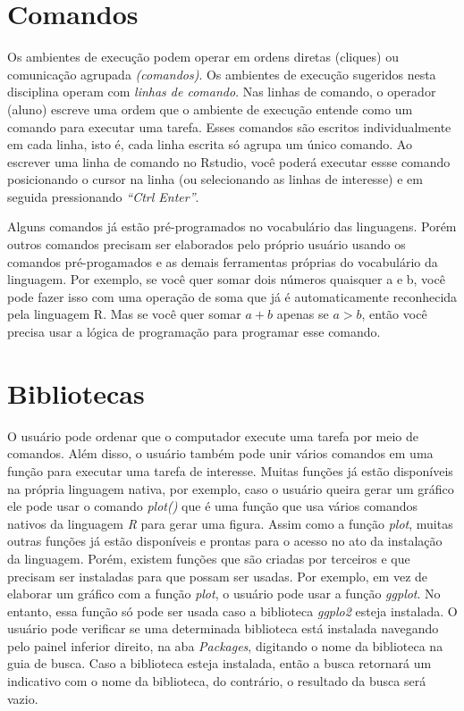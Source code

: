 \documentclass[
  letterpaper,
  DIV=11,
  numbers=noendperiod]{scrreprt}
\begin{document}
\section{Comandos}\label{comandos}

Os ambientes de execução podem operar em ordens diretas (cliques) ou
comunicação agrupada \emph{(comandos)}. Os ambientes de execução
sugeridos nesta disciplina operam com \emph{linhas de comando}. Nas
linhas de comando, o operador (aluno) escreve uma ordem que o ambiente
de execução entende como um comando para executar uma tarefa. Esses
comandos são escritos individualmente em cada linha, isto é, cada linha
escrita só agrupa um único comando. Ao escrever uma linha de comando no
Rstudio, você poderá executar essse comando posicionando o cursor na
linha (ou selecionando as linhas de interesse) e em seguida pressionando
\emph{``Ctrl Enter''}.

Alguns comandos já estão pré-programados no vocabulário das linguagens.
Porém outros comandos precisam ser elaborados pelo próprio usuário
usando os comandos pré-progamados e as demais ferramentas próprias do
vocabulário da linguagem. Por exemplo, se você quer somar dois números
quaisquer a e b, você pode fazer isso com uma operação de soma que já é
automaticamente reconhecida pela linguagem R. Mas se você quer somar
\(a + b\) apenas se \(a > b\), então você precisa usar a lógica de
programação para programar esse comando.

\section{Bibliotecas}\label{bibliotecas}

O usuário pode ordenar que o computador execute uma tarefa por meio de
comandos. Além disso, o usuário também pode unir vários comandos em uma
função para executar uma tarefa de interesse. Muitas funções já estão
disponíveis na própria linguagem nativa, por exemplo, caso o usuário
queira gerar um gráfico ele pode usar o comando \emph{plot()} que é uma
função que usa vários comandos nativos da linguagem \emph{R} para gerar
uma figura. Assim como a função \emph{plot}, muitas outras funções já
estão disponíveis e prontas para o acesso no ato da instalação da
linguagem. Porém, existem funções que são criadas por terceiros e que
precisam ser instaladas para que possam ser usadas. Por exemplo, em vez
de elaborar um gráfico com a função \emph{plot}, o usuário pode usar a
função \emph{ggplot}. No entanto, essa função só pode ser usada caso a
biblioteca \emph{ggplo2} esteja instalada. O usuário pode verificar se
uma determinada biblioteca está instalada navegando pelo painel inferior
direito, na aba \emph{Packages}, digitando o nome da biblioteca na guia
de busca. Caso a biblioteca esteja instalada, então a busca retornará um
indicativo com o nome da biblioteca, do contrário, o resultado da busca
será vazio.
\end{document}
